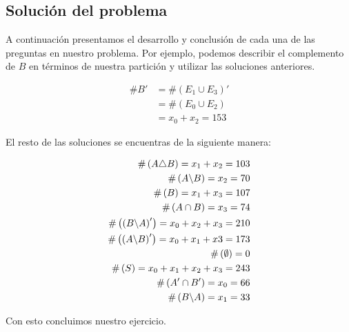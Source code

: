 \subsection{Solución del problema}

A continuación presentamos el desarrollo y conclusión de cada una de las preguntas en nuestro problema. Por ejemplo, podemos describir el complemento de $ B $ en términos de nuestra partición y utilizar las soluciones anteriores. 

\begin{align*}
	\# B' 
	&= \#\left(E_1 \cup E_3\right)'\\
	&= \#\left(E_0 \cup E_2\right)\\
	&= x_0 + x_2 = 153
\end{align*}

El resto de las soluciones se encuentras de la siguiente manera:

\begin{align*}
	\#\left( A\triangle B \right) = x_1+x_2 = 103  \\
	\#\left( A\backslash B \right) = x_2 = 70 \\
	\#\left( B \right) = x_1+x_3=107	\\
	\#\left( A \cap B \right) = x_3 = 74 \\
	\#\left( \left(B\backslash A\right)' \right) 
	= x_0+x_2+x_3 = 210 \\
	\#\left( \left(A\backslash B\right)' \right)
	= x_0+x_1+x3 = 173 \\
	\#\left( \emptyset \right) = 0 \\
	\#\left( S \right) = x_0+x_1+x_2+x_3 = 243 \\
	\#\left( A' \cap B' \right) = x_0 = 66\\
	\#\left( B\backslash A \right) = x_1 = 33
\end{align*}

Con esto concluimos nuestro ejercicio. 